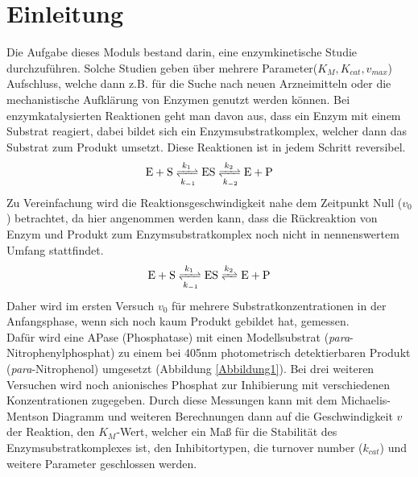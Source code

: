 \section{Einleitung}

Die Aufgabe dieses Moduls bestand darin, eine enzymkinetische Studie durchzuführen. Solche Studien geben über mehrere Parameter($K_M, K_{cat}, v_{max}$) Aufschluss, welche dann z.B. für die Suche nach neuen Arzneimitteln oder die mechanistische Aufklärung von Enzymen genutzt werden können. Bei enzymkatalysierten Reaktionen geht man davon aus, dass ein Enzym mit einem Substrat reagiert, dabei bildet sich ein Enzymsubstratkomplex, welcher dann das Substrat zum Produkt umsetzt. Diese Reaktionen ist in jedem Schritt reversibel. 
 \begin{align}
    \mathrm{E} + \mathrm{S} \xrightleftharpoons[k_{-1}]{k_1} \mathrm{ES}
    \xrightleftharpoons[k_{-2}]{k_2} \mathrm{E} + \mathrm{P}
 \end{align}
 Zu Vereinfachung wird die Reaktionsgeschwindigkeit nahe dem Zeitpunkt Null ($v_0$) betrachtet, da hier angenommen werden kann, dass die Rückreaktion von Enzym und Produkt zum Enzymsubstratkomplex noch nicht in nennenswertem Umfang stattfindet.  
 \begin{align}
    \mathrm{E} + \mathrm{S} \xrightleftharpoons[k_{-1}]{k_1} \mathrm{ES}
    \xrightleftharpoons{k_2} \mathrm{E} + \mathrm{P}
 \end{align}
 Daher wird im ersten Versuch $v_0$ für mehrere Substratkonzentrationen in der Anfangsphase, wenn sich noch kaum Produkt gebildet hat, gemessen. \\
 Dafür wird eine APase (Phosphatase) mit einen Modellsubstrat (\textit{para}-Nitrophenylphosphat) zu einem bei 405nm photometrisch detektierbaren Produkt (\textit{para}-Nitrophenol) umgesetzt (Abbildung \ref{Abbildung1}).
 Bei drei weiteren Versuchen wird noch anionisches Phosphat zur Inhibierung mit verschiedenen Konzentrationen zugegeben. Durch diese Messungen kann mit dem Michaelis-Mentson Diagramm und weiteren Berechnungen dann auf die Geschwindigkeit $v$ der Reaktion, den $K_M$-Wert, welcher ein Maß für die Stabilität des Enzymsubstratkomplexes ist, den Inhibitortypen, die turnover number ($k_{cat}$) und weitere Parameter geschlossen werden.
  
